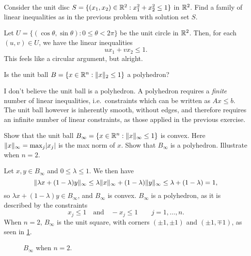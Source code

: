 \begin{exercise}
  Consider the unit disc $S = \{ (x_1, x_2) \in \mathbb{R}^2 : x_1^2 + x_2^2 \leq 1 \}$ in $\mathbb{R}^2$.
  Find a family of linear inequalities as in the previous problem with solution set $S$.
\end{exercise}

\begin{solution}
  Let $U = \{ (\cos\theta, \sin\theta) : 0 \leq \theta < 2\pi \}$ be the unit circle in $\mathbb{R}^2$.
  Then, for each $(u, v) \in U$, we have the linear inequalities
  \begin{equation}
    u x_1 + v x_2 \leq 1.
  \end{equation}
  This feels like a circular argument, but alright.
\end{solution}

\begin{exercise}
  Is the unit ball $B = \{ x \in \mathbb{R}^n : \lVert x\rVert_2 \leq 1 \}$ a polyhedron?
\end{exercise}

\begin{solution}
  I don't believe the unit ball is a polyhedron.
  A polyhedron requires a \emph{finite} number of linear inequalities, i.e.\ constraints which can be written as $Ax \leq b$.
  The unit ball however is inherently smooth, without edges, and therefore requires an infinite number of linear constraints, as those applied in the previous exercise.
\end{solution}

\begin{exercise}
  Show that the unit ball $B_\infty = \{ x \in \mathbb{R}^n : \lVert x\rVert_\infty \leq 1 \}$ is convex.
  Here $\lVert x\rVert_\infty = \max_j \lvert x_j\rvert$ is the max norm of $x$.
  Show that $B_\infty$ is a polyhedron.
  Illustrate when $n = 2$.
\end{exercise}

\begin{solution}
  Let $x, y \in B_\infty$ and $0 \leq \lambda \leq 1$.
  We then have
  \begin{equation}
    \lVert\lambda x + (1 - \lambda) y\rVert_\infty \leq \lambda \lVert x\rVert_\infty + (1 - \lambda) \lVert y\rVert_\infty \leq \lambda + (1 - \lambda) = 1,
  \end{equation}
  so $\lambda x + (1 - \lambda) y \in B_\infty$, and $B_\infty$ is convex.
  $B_\infty$ is a polyhedron, as it is described by the constraints
  \begin{equation}
    x_j \leq 1
    \quad\text{and}\quad
    -x_j \leq 1
    \qquad
    j = 1, \ldots, n.
  \end{equation}
  When $n = 2$, $B_\infty$ is the unit square, with corners $(\pm 1, \pm 1)$ and $(\pm 1, \mp 1)$, as seen in \cref{fig:unit_square}.

  \begin{figure}[htbp]
    \centering

    \resizebox{0.4\textwidth}{!}{
      
    }
    \caption{$B_\infty$ when $n = 2$.\label{fig:unit_square}}
  \end{figure}
\end{solution}

